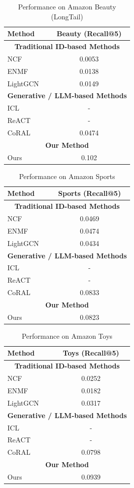 \begin{table}[htbp]
\centering
\caption{Performance on Amazon Beauty (LongTail)}
\label{tab:beauty_results}
\begin{tabular}{lc}
\toprule
Method & Beauty (Recall@5) \\
\midrule
\multicolumn{2}{c}{\textbf{Traditional ID-based Methods}} \\
NCF & 0.0053 \\
ENMF & 0.0138 \\
LightGCN & 0.0149 \\
\multicolumn{2}{c}{\textbf{Generative / LLM-based Methods}} \\
ICL & - \\
ReACT & - \\
CoRAL & 0.0474 \\
\multicolumn{2}{c}{\textbf{Our Method}} \\
Ours & 0.102 \\
\bottomrule
\end{tabular}
\end{table}

\begin{table}[htbp]
\centering
\caption{Performance on Amazon Sports}
\label{tab:sports_results}
\begin{tabular}{lc}
\toprule
Method & Sports (Recall@5) \\
\midrule
\multicolumn{2}{c}{\textbf{Traditional ID-based Methods}} \\
NCF & 0.0469 \\
ENMF & 0.0474 \\
LightGCN & 0.0434 \\
\multicolumn{2}{c}{\textbf{Generative / LLM-based Methods}} \\
ICL & - \\
ReACT & - \\
CoRAL & 0.0833 \\
\multicolumn{2}{c}{\textbf{Our Method}} \\
Ours & 0.0823 \\
\bottomrule
\end{tabular}
\end{table}

\begin{table}[htbp]
\centering
\caption{Performance on Amazon Toys}
\label{tab:toys_results}
\begin{tabular}{lc}
\toprule
Method & Toys (Recall@5) \\
\midrule
\multicolumn{2}{c}{\textbf{Traditional ID-based Methods}} \\
NCF & 0.0252 \\
ENMF & 0.0182 \\
LightGCN & 0.0317 \\
\multicolumn{2}{c}{\textbf{Generative / LLM-based Methods}} \\
ICL & - \\
ReACT & - \\
CoRAL & 0.0798 \\
\multicolumn{2}{c}{\textbf{Our Method}} \\
Ours & 0.0939 \\
\bottomrule
\end{tabular}
\end{table}

